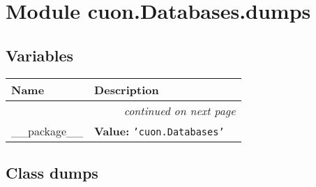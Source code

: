 %
%
%


\section{Module cuon.Databases.dumps}

    \label{cuon:Databases:dumps}


  \subsection{Variables}

    \vspace{-1cm}
\hspace{\varindent}\begin{longtable}{|p{\varnamewidth}|p{\vardescrwidth}|l}
\cline{1-2}
\cline{1-2} \centering \textbf{Name} & \centering \textbf{Description}& \\
\cline{1-2}
\endhead\cline{1-2}\multicolumn{3}{r}{\small\textit{continued on next page}}\\\endfoot\cline{1-2}
\endlastfoot\raggedright \_\-\_\-p\-a\-c\-k\-a\-g\-e\-\_\-\_\- & \raggedright \textbf{Value:} 
{\tt \texttt{'}\texttt{cuon.Databases}\texttt{'}}&\\
\cline{1-2}
\end{longtable}



\subsection{Class dumps}

